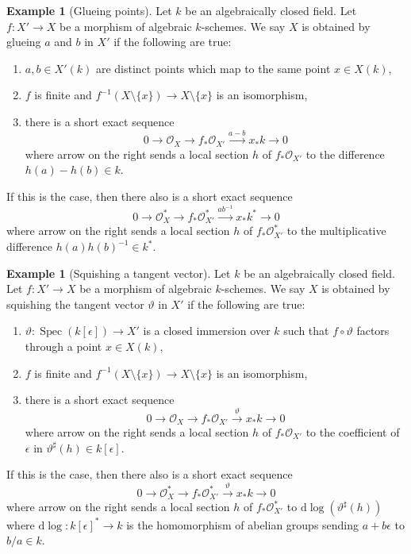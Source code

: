 \documentclass{stacks-project}
\theoremstyle{plain}
\theoremstyle{definition}
\newtheorem{example}[subsection]{Example}
\theoremstyle{remark}
\numberwithin{equation}{subsection}
\def\Spec{\mathop{\mathrm{Spec}}}
\begin{document}
\begin{example}[Glueing points]
\label{example-glue-points}
Let $k$ be an algebraically closed field. Let $f : X' \to X$
be a morphism of algebraic $k$-schemes. We say $X$ is
obtained by glueing $a$ and $b$ in $X'$ if the following are true:
\begin{enumerate}
\item $a, b \in X'(k)$ are distinct points which map to the same
point $x \in X(k)$,
\item $f$ is finite and
$f^{-1}(X \setminus \{x\}) \to X \setminus \{x\}$ is an isomorphism,
\item there is a short exact sequence
$$
0 \to \mathcal{O}_X \to f_*\mathcal{O}_{X'} \xrightarrow{a - b} x_*k \to 0
$$
where arrow on the right sends a local section $h$ of $f_*\mathcal{O}_{X'}$
to the difference $h(a) - h(b) \in k$.
\end{enumerate}
If this is the case, then there also is a short exact sequence
$$
0 \to \mathcal{O}_X^* \to f_*\mathcal{O}_{X'}^*
\xrightarrow{ab^{-1}} x_*k^* \to 0
$$
where arrow on the right sends a local section $h$ of $f_*\mathcal{O}_{X'}^*$
to the multiplicative difference $h(a)h(b)^{-1} \in k^*$.
\end{example}

\begin{example}[Squishing a tangent vector]
\label{example-squish-tangent-vector}
Let $k$ be an algebraically closed field. Let $f : X' \to X$
be a morphism of algebraic $k$-schemes. We say $X$ is
obtained by squishing the tangent vector $\vartheta$ in $X'$
if the following are true:
\begin{enumerate}
\item $\vartheta : \Spec(k[\epsilon]) \to X'$ is a closed immersion
over $k$ such that $f \circ \vartheta$ factors through a point $x \in X(k)$,
\item $f$ is finite and
$f^{-1}(X \setminus \{x\}) \to X \setminus \{x\}$ is an isomorphism,
\item there is a short exact sequence
$$
0 \to \mathcal{O}_X \to f_*\mathcal{O}_{X'} \xrightarrow{\vartheta} x_*k \to 0
$$
where arrow on the right sends a local section $h$ of $f_*\mathcal{O}_{X'}$
to the coefficient of $\epsilon$ in $\vartheta^\sharp(h) \in k[\epsilon]$.
\end{enumerate}
If this is the case, then there also is a short exact sequence
$$
0 \to \mathcal{O}_X^* \to f_*\mathcal{O}_{X'}^*
\xrightarrow{\vartheta} x_*k \to 0
$$
where arrow on the right sends a local section $h$ of $f_*\mathcal{O}_{X'}^*$
to $\text{d}\log(\vartheta^\sharp(h))$ where
$\text{d}\log : k[\epsilon]^* \to k$
is the homomorphism of abelian groups sending $a + b\epsilon$ to $b/a \in k$.
\end{example}
\end{document}
